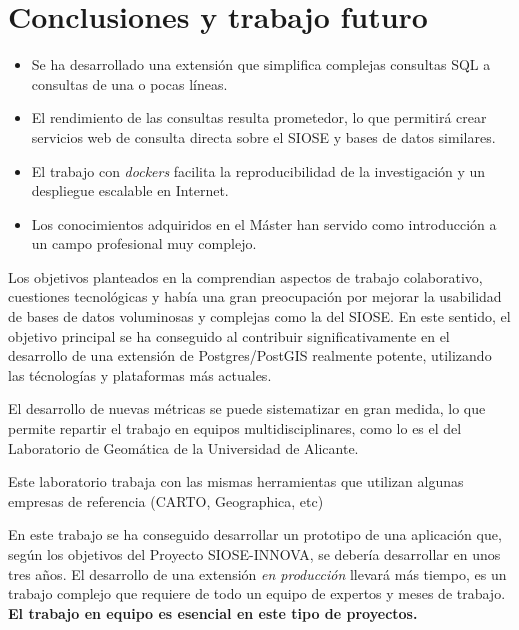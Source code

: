 \chapter{Conclusiones y trabajo futuro}\label{chap:concl}

\begin{graybox}
\begin{itemize}
\item Se ha desarrollado una extensión que simplifica complejas consultas SQL a consultas de una o pocas líneas.
\item El rendimiento de las consultas resulta prometedor, lo que permitirá crear servicios web de consulta directa sobre el SIOSE y bases de datos similares.   
\item El trabajo con \textit{dockers} facilita la reproducibilidad de la investigación y un despliegue escalable en Internet.
\item Los conocimientos adquiridos en el Máster han servido como introducción a un campo profesional muy complejo.
\end{itemize}
\end{graybox}

Los objetivos planteados en la  comprendian aspectos de trabajo colaborativo, cuestiones tecnológicas y había una gran preocupación por mejorar la usabilidad de bases de datos voluminosas y complejas como la del SIOSE. En este sentido, el objetivo principal se ha conseguido al contribuir significativamente en el desarrollo de una extensión de Postgres/PostGIS realmente potente, utilizando las técnologías y plataformas más actuales.

El desarrollo de nuevas métricas se puede sistematizar en gran medida, lo que permite repartir el trabajo en equipos multidisciplinares, como lo es el del Laboratorio de Geomática de la Universidad de Alicante.

Este laboratorio trabaja con las mismas herramientas que utilizan algunas empresas de referencia (CARTO, Geographica, etc) 

En este trabajo se ha conseguido desarrollar un prototipo de una aplicación que, según los objetivos del Proyecto SIOSE-INNOVA, se debería desarrollar en unos tres años. El desarrollo de una extensión \textit{en producción} llevará más tiempo, es un trabajo complejo que requiere de todo un equipo de expertos y meses de trabajo. \textbf{El trabajo en equipo es esencial en este tipo de proyectos.}


